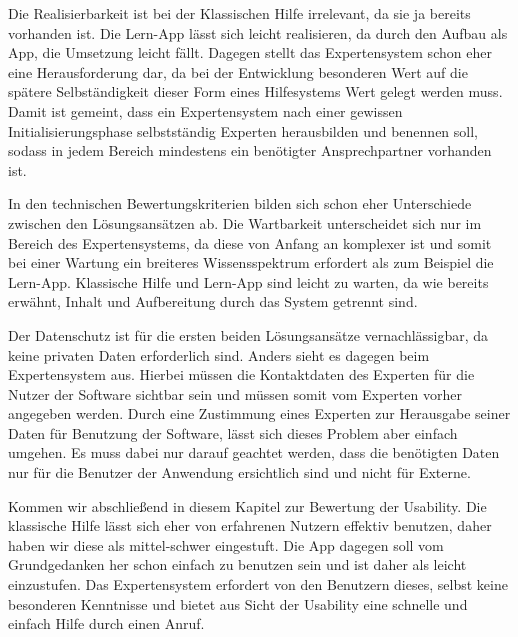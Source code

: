 Die Realisierbarkeit ist bei der Klassischen Hilfe irrelevant, da sie ja bereits vorhanden ist. Die Lern-App lässt sich leicht realisieren, da durch den Aufbau als App, die Umsetzung leicht fällt. Dagegen stellt das Expertensystem schon eher eine Herausforderung dar, da bei der Entwicklung besonderen Wert auf die spätere Selbständigkeit dieser Form eines Hilfesystems Wert gelegt werden muss. Damit ist gemeint, dass ein Expertensystem nach einer gewissen Initialisierungsphase selbstständig Experten herausbilden und benennen soll, sodass in jedem Bereich mindestens ein benötigter Ansprechpartner vorhanden ist.
 \par
In den technischen Bewertungskriterien bilden sich schon eher Unterschiede zwischen den Lösungsansätzen ab. Die Wartbarkeit unterscheidet sich nur im Bereich des Expertensystems, da diese von Anfang an komplexer ist und somit bei einer Wartung ein breiteres Wissensspektrum erfordert als zum Beispiel die Lern-App. Klassische Hilfe und Lern-App sind leicht zu warten, da wie bereits erwähnt, Inhalt und Aufbereitung durch das System getrennt sind.
\par
Der Datenschutz ist für die ersten beiden Lösungsansätze vernachlässigbar, da keine privaten Daten erforderlich sind. Anders sieht es dagegen beim Expertensystem aus. Hierbei müssen die Kontaktdaten des Experten für die Nutzer der Software sichtbar sein und müssen somit vom Experten vorher angegeben werden. Durch eine Zustimmung eines Experten zur Herausgabe seiner Daten für Benutzung der Software, lässt sich dieses Problem aber einfach umgehen. Es muss dabei nur darauf geachtet werden, dass die benötigten Daten nur für die Benutzer der Anwendung ersichtlich sind und nicht für Externe.
\par
Kommen wir abschließend in diesem Kapitel zur Bewertung der Usability. Die klassische Hilfe lässt sich eher von erfahrenen Nutzern effektiv benutzen, daher haben wir diese als mittel-schwer eingestuft. Die App dagegen soll vom Grundgedanken her schon einfach zu benutzen sein und ist daher als leicht einzustufen. Das Expertensystem erfordert von den Benutzern dieses, selbst keine besonderen Kenntnisse und bietet aus Sicht der Usability eine schnelle und einfach Hilfe durch einen Anruf. 



